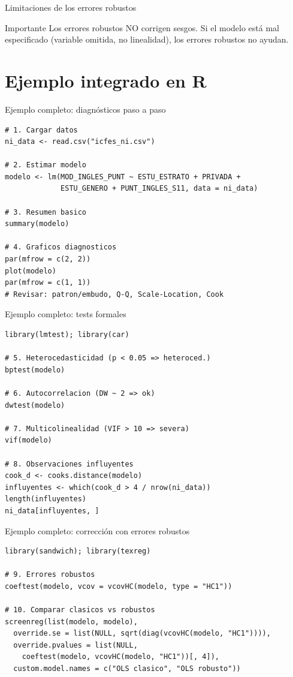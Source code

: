 \documentclass[aspectratio=169, 11pt]{beamer}
\begin{document}
\begin{frame}{Limitaciones de los errores robustos}
\begin{alertblock}{Importante}
Los errores robustos NO corrigen sesgos. Si el modelo está mal especificado (variable omitida, no linealidad), los errores robustos no ayudan.
\end{alertblock}
\end{frame}

\section{Ejemplo integrado en R}

\begin{frame}[fragile]{Ejemplo completo: diagnósticos paso a paso}
\small
\begin{lstlisting}
# 1. Cargar datos
ni_data <- read.csv("icfes_ni.csv")

# 2. Estimar modelo
modelo <- lm(MOD_INGLES_PUNT ~ ESTU_ESTRATO + PRIVADA +
             ESTU_GENERO + PUNT_INGLES_S11, data = ni_data)

# 3. Resumen basico
summary(modelo)

# 4. Graficos diagnosticos
par(mfrow = c(2, 2))
plot(modelo)
par(mfrow = c(1, 1))
# Revisar: patron/embudo, Q-Q, Scale-Location, Cook
\end{lstlisting}
\end{frame}

\begin{frame}[fragile]{Ejemplo completo: tests formales}
\small
\begin{lstlisting}
library(lmtest); library(car)

# 5. Heterocedasticidad (p < 0.05 => heteroced.)
bptest(modelo)

# 6. Autocorrelacion (DW ~ 2 => ok)
dwtest(modelo)

# 7. Multicolinealidad (VIF > 10 => severa)
vif(modelo)

# 8. Observaciones influyentes
cook_d <- cooks.distance(modelo)
influyentes <- which(cook_d > 4 / nrow(ni_data))
length(influyentes)
ni_data[influyentes, ]
\end{lstlisting}
\end{frame}

\begin{frame}[fragile]{Ejemplo completo: corrección con errores robustos}
\small
\begin{lstlisting}
library(sandwich); library(texreg)

# 9. Errores robustos
coeftest(modelo, vcov = vcovHC(modelo, type = "HC1"))

# 10. Comparar clasicos vs robustos
screenreg(list(modelo, modelo),
  override.se = list(NULL, sqrt(diag(vcovHC(modelo, "HC1")))),
  override.pvalues = list(NULL,
    coeftest(modelo, vcovHC(modelo, "HC1"))[, 4]),
  custom.model.names = c("OLS clasico", "OLS robusto"))
\end{lstlisting}
\end{frame}
\end{document}
